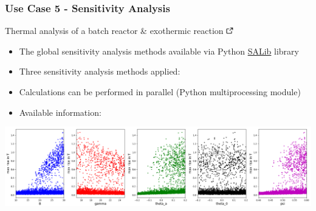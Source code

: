 \documentclass[compress,newPxFont,sthlmFooter]{beamer}
\begin{document}
\begin{frame}[plain]
\frametitle{Use Case 5 - Sensitivity Analysis}
    \begin{center}
        \alert{Thermal analysis of a batch reactor \& exothermic reaction} \href{http://daetools.com/docs/tutorials-sa.html\#tutorial_sa_3}{\includegraphics[align=b, height=0.8em]{link.png}}
    \end{center}   
    {\scriptsize
    \begin{itemize}
      \item The global sensitivity analysis methods available via Python \alert{\href{http://salib.readthedocs.io}{SALib}} library
      \item Three sensitivity analysis methods applied:
      \item \alert{Calculations can be performed in parallel} (Python \alert{multiprocessing} module)
      \item Available information:
    \end{itemize}
    }    
    \begin{center}
        \includegraphics[align=c, width=\textwidth]{sa_scatter_sobol.png}
    \end{center}
    
\end{frame}
\end{document}
